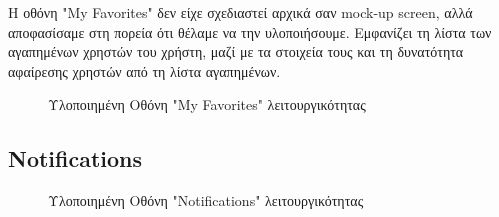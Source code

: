 \documentclass[12pt,a4paper]{article}
\begin{document}
Η οθόνη "My Favorites" δεν είχε σχεδιαστεί αρχικά σαν mock-up screen, αλλά αποφασίσαμε στη πορεία ότι θέλαμε να την υλοποιήσουμε. Εμφανίζει τη λίστα των αγαπημένων χρηστών του χρήστη, μαζί με τα στοιχεία τους και τη δυνατότητα αφαίρεσης χρηστών από τη λίστα αγαπημένων.

\begin{figure}[H]
	\caption{Υλοποιημένη Οθόνη "My Favorites" λειτουργικότητας}
	\label{Υλοποιημένη Οθόνη "My Favorites" λειτουργικότητας}
\end{figure}


\subsection{Notifications}

\begin{figure}[H]
	\caption{Υλοποιημένη Οθόνη "Notifications" λειτουργικότητας}
	\label{Υλοποιημένη Οθόνη "Notifications" λειτουργικότητας}
\end{figure}
\end{document}
